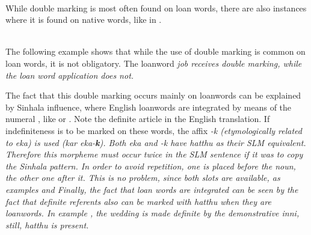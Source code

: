 
 \\
While double marking is most often found on loan words, there are also instances where it is found on native words, like  in .


\\



The following example shows that while the use of double marking is common on loan words, it is not obligatory. The loanword \em job \em receives double marking, while the loan word \em application \em does not.





The fact that this double marking occurs mainly on loanwords can be explained by Sinhala influence, where English loanwords are integrated by means of the numeral , like  or  \citep{Karunatillake2004}. Note the definite article in the English translation. If indefiniteness is to be marked on these words, the affix \em -k \em (etymologically related to \em eka\em) is used (\em kar eka-\textbf{k}\em). Both \em eka \em and \em -k \em have \em hatthu \em as their SLM equivalent. Therefore this morpheme must occur twice in the SLM sentence if it was to copy the Sinhala pattern.  In order to avoid repetition, one is placed before the noun, the other one after it. This is no problem, since both slots are available, as examples  and 
Finally, the fact that loan words are integrated can be seen by the fact that definite referents also can be marked with \em hatthu \em when they are loanwords. In example , the wedding is made definite by the demonstrative \em inni\em, still, \em hatthu \em is present.

